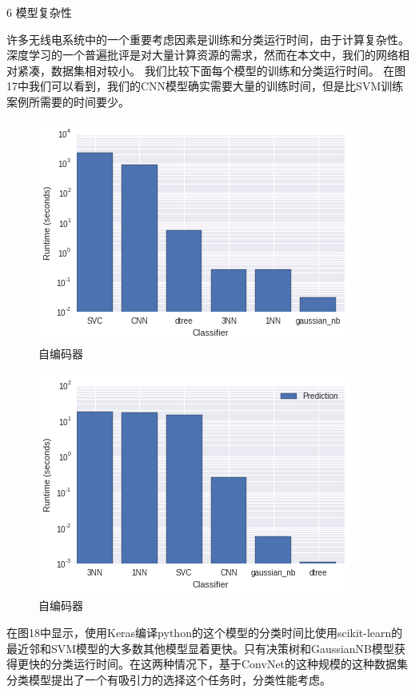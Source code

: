 6 模型复杂性\par

许多无线电系统中的一个重要考虑因素是训练和分类运行时间，由于计算复杂性。 深度学习的一个普遍批评是对大量计算资源的需求，然而在本文中，我们的网络相对紧凑，数据集相对较小。 我们比较下面每个模型的训练和分类运行时间。 在图17中我们可以看到，我们的CNN模型确实需要大量的训练时间，但是比SVM训练案例所需要的时间要少。\par
\begin{figure}[!h]
	\centering
	\includegraphics[scale=0.5]{figures/chapter_3/train_time}
	\caption{自编码器}	\label{fig_3_2}
\end{figure}
\begin{figure}[!h]
	\centering
	\includegraphics[scale=0.5]{figures/chapter_3/classify_time}
	\caption{自编码器}	\label{fig_3_2}
\end{figure}

在图18中显示，使用Keras编译python的这个模型的分类时间比使用scikit-learn的最近邻和SVM模型的大多数其他模型显着更快。只有决策树和GaussianNB模型获得更快的分类运行时间。在这两种情况下，基于ConvNet的这种规模的这种数据集分类模型提出了一个有吸引力的选择这个任务时，分类性能考虑。\par



